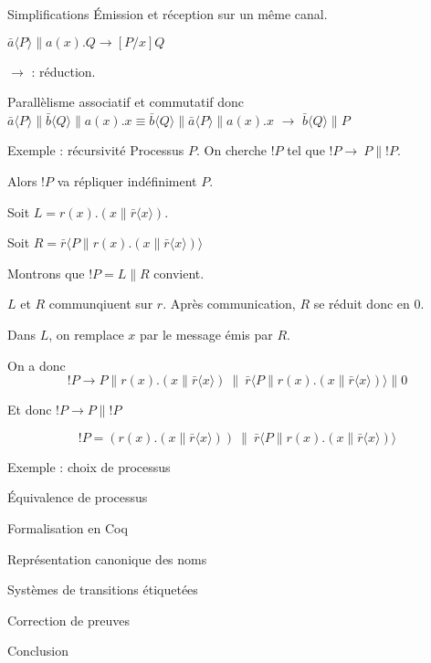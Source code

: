 \documentclass{beamer}
\begin{document}
\begin{frame}{Simplifications}
Émission et réception sur un même canal.

$\bar{a}\langle P\rangle\|a(x).Q \rightarrow [P/x]Q$

$\rightarrow$ : réduction.

Parallèlisme associatif et commutatif donc 
$\bar{a}\langle P\rangle\|\bar{b}\langle Q\rangle\|a(x).x \equiv  \bar{b}\langle Q\rangle\|\bar{a}\langle P\rangle\|a(x).x$ $\rightarrow$ $\bar{b}\langle Q\rangle\|P$
\end{frame}

\begin{frame}{Exemple : récursivité}
Processus $P$. On cherche $!P$ tel que $!P\rightarrow\ P\|!P$.

Alors $!P$ va répliquer indéfiniment $P$.


Soit $L = r(x).(x\|\bar{r}\langle x\rangle)$.

Soit $R = \bar{r}\langle P\|r(x).(x\|\bar{r}\langle x\rangle)\rangle$

Montrons que $!P = L\|R$ convient.

$L$ et $R$ communqiuent sur $r$. Après communication, $R$ se réduit donc en $0$.

Dans $L$, on remplace $x$ par le message émis par $R$.


On a donc $$!P\rightarrow P\|r(x).(x\|\bar{r}\langle x\rangle)\ \|\ \bar{r}\langle P\|r(x).(x\|\bar{r}\langle x\rangle)\rangle\| 0$$

Et donc $!P\rightarrow P\|!P$
\begin{alertblock}{}
 $$!P = (r(x).(x\|\bar{r}\langle x\rangle))\ \|\ \bar{r}\langle P\|r(x).(x\|\bar{r}\langle x\rangle)\rangle$$
\end{alertblock}
\end{frame}

\begin{frame}{Exemple : choix de processus}
\end{frame}

\begin{frame}{Équivalence de processus}
\end{frame}

\begin{frame}{Formalisation en Coq}
\end{frame}

\begin{frame}{Représentation canonique des noms}
\end{frame}

\begin{frame}{Systèmes de transitions étiquetées}
\end{frame}

\begin{frame}{Correction de preuves}
\end{frame}

\begin{frame}{Conclusion}
\end{frame}
\end{document}
